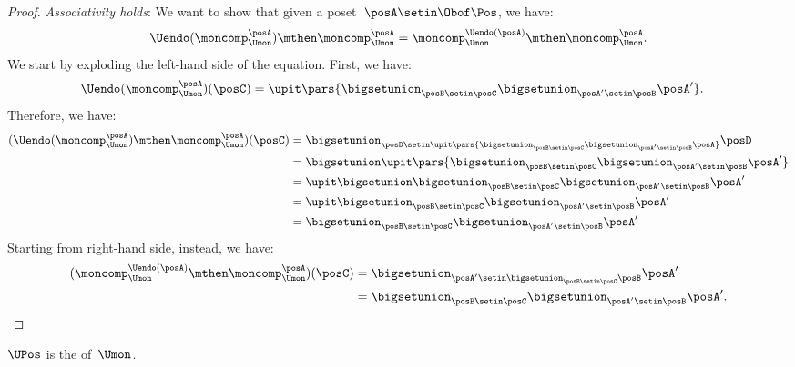 \begin{proof}
    \emph{Associativity holds}: We want to show that given a poset~$\posA\setin \Obof\Pos$, we have:
    \begin{equation}
        \Uendo(\moncomp_{\Umon}^{\posA})\mthen \moncomp_{\Umon}^{\posA}= \moncomp_{\Umon}^{\Uendo(\posA)}\mthen \moncomp_{\Umon}^{\posA}.
    \end{equation}
    We start by exploding the left-hand side of the equation.
    First, we have:
    \begin{equation}
        \begin{aligned}
            \Uendo(\moncomp_{\Umon}^{\posA})(\posC) & =\upit \pars{ \bigsetunion_{\posB\setin \posC}\bigsetunion_{\posA'\setin \posB} \posA'}.
        \end{aligned}
    \end{equation}
    Therefore, we have:
    \begin{equation}
        \begin{aligned}
            (\Uendo(\moncomp_{\Umon}^{\posA})\mthen \moncomp_{\Umon}^{\posA})(\posC)
             & =\bigsetunion_{\posD \setin \upit \pars{ \bigsetunion_{\posB\setin \posC}\bigsetunion_{\posA'\setin \posB} \posA}} \posD \\
             & =\bigsetunion \upit \pars{ \bigsetunion_{\posB\setin \posC}\bigsetunion_{\posA'\setin \posB} \posA'} \\
             & =\upit \bigsetunion \bigsetunion_{\posB\setin \posC}\bigsetunion_{\posA'\setin \posB} \posA' \\
             & =\upit  \bigsetunion_{\posB\setin \posC}\bigsetunion_{\posA'\setin \posB} \posA' \\
             & = \bigsetunion_{\posB\setin \posC}\bigsetunion_{\posA'\setin \posB} \posA'
        \end{aligned}
    \end{equation}
    Starting from right-hand side, instead, we have:
    \begin{equation}
        \begin{aligned}
            (\moncomp_{\Umon}^{\Uendo(\posA)}\mthen \moncomp_{\Umon}^{\posA})(\posC)
             & =\bigsetunion_{\posA'\setin \bigsetunion_{\posB\setin \posC}\posB}\posA' \\
             & =\bigsetunion_{\posB\setin \posC}\bigsetunion_{\posA'\setin \posB} \posA'.
        \end{aligned}
    \end{equation}
\end{proof}

\begin{lemma}
    \label{lem:uposkleisli}
    $\UPos$ is the  of~$\Umon$.
\end{lemma}
